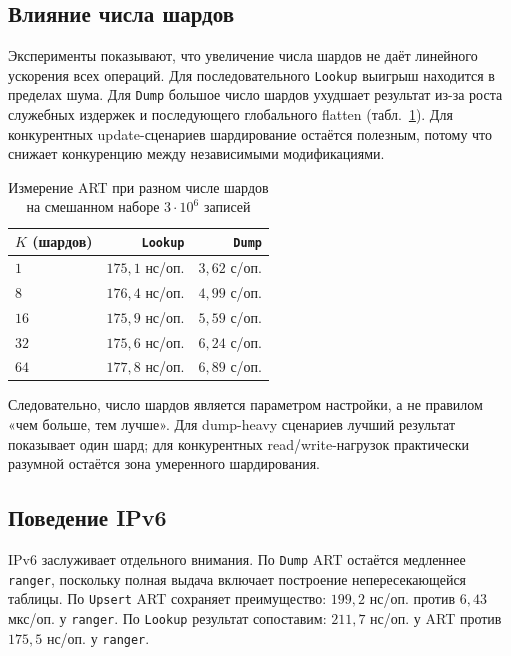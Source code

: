 \subsection{Влияние числа шардов}

Эксперименты показывают, что увеличение числа шардов не даёт линейного
ускорения всех операций. Для последовательного \texttt{Lookup} выигрыш
находится в пределах шума. Для \texttt{Dump} большое число шардов
ухудшает результат из-за роста служебных издержек и последующего
глобального flatten (табл.~\ref{tab:bench-shards}). Для конкурентных
update-сценариев шардирование остаётся полезным, потому что снижает
конкуренцию между независимыми модификациями.

\begin{table}[ht]
\centering
\caption{Измерение ART при разном числе шардов на смешанном наборе
$3\cdot10^6$ записей}
\label{tab:bench-shards}
\small
\begin{tabular}{lrr}
\toprule
$K$ (шардов) & \texttt{Lookup} & \texttt{Dump} \\
\midrule
$1$  & $175{,}1$ нс/оп. & $3{,}62$ с/оп. \\
$8$  & $176{,}4$ нс/оп. & $4{,}99$ с/оп. \\
$16$ & $175{,}9$ нс/оп. & $5{,}59$ с/оп. \\
$32$ & $175{,}6$ нс/оп. & $6{,}24$ с/оп. \\
$64$ & $177{,}8$ нс/оп. & $6{,}89$ с/оп. \\
\bottomrule
\end{tabular}
\end{table}

Следовательно, число шардов является параметром настройки, а не
правилом «чем больше, тем лучше». Для dump-heavy сценариев лучший
результат показывает один шард; для конкурентных read/write-нагрузок
практически разумной остаётся зона умеренного шардирования.

\subsection{Поведение IPv6}

IPv6 заслуживает отдельного внимания. По \texttt{Dump} ART остаётся
медленнее \texttt{ranger}, поскольку полная выдача включает построение
непересекающейся таблицы. По \texttt{Upsert} ART сохраняет преимущество:
$199{,}2$ нс/оп. против $6{,}43$ мкс/оп. у \texttt{ranger}. По
\texttt{Lookup} результат сопоставим: $211{,}7$ нс/оп. у ART против
$175{,}5$ нс/оп. у \texttt{ranger}.

